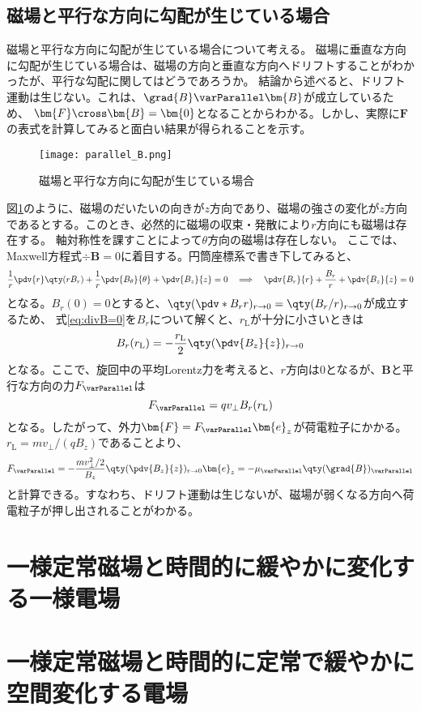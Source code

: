 \subsection{磁場と平行な方向に勾配が生じている場合}
磁場と平行な方向に勾配が生じている場合について考える。
磁場に垂直な方向に勾配が生じている場合は、磁場の方向と垂直な方向へドリフトすることがわかったが、平行な勾配に関してはどうであろうか。
結論から述べると、ドリフト運動は生じない。これは、$\grad{B}\varParallel \bm{B}$が成立しているため、
$\bm{F}\cross\bm{B} = \bm{0}$となることからわかる。しかし、実際に$\bm{F}$の表式を計算してみると面白い結果が得られることを示す。

\begin{figure}[H]
	\centering
	\texttt{[image: parallel\_B.png]}
	\caption{磁場と平行な方向に勾配が生じている場合}
	\label{fig:parallel_B}
\end{figure}
図\ref{fig:parallel_B}のように、磁場のだいたいの向きが$z$方向であり、磁場の強さの変化が$z$方向であるとする。このとき、必然的に磁場の収束・発散により$r$方向にも磁場は存在する。
軸対称性を課すことによって$\theta$方向の磁場は存在しない。
ここでは、Maxwell方程式$\div{\bm{B}} = 0$に着目する。円筒座標系で書き下してみると、
\begin{equation}
	\frac{1}{r}\pdv{r}\qty(rB_r) + \frac{1}{r}\pdv{B_\theta}{\theta} + \pdv{B_z}{z} = 0 \quad\Longrightarrow\quad \pdv{B_r}{r} + \frac{B_r}{r} + \pdv{B_z}{z} = 0
	\label{eq:divB=0}
\end{equation}
となる。$B_r(0) = 0$とすると、$\qty(\pdv*{B_r}{r})_{r\to 0} = \qty(B_r/r)_{r\to 0}$が成立するため、
式\eqref{eq:divB=0}を$B_r$について解くと、$r_{\text{L}}$が十分に小さいときは
\begin{equation}
	B_r(r_{\text{L}}) = -\frac{r_{\text{L}}}{2}\qty(\pdv{B_z}{z})_{r\to 0}
\end{equation}
となる。ここで、旋回中の平均Lorentz力を考えると、$r$方向は$0$となるが、$\bm{B}$と平行な方向の力$F_{\varParallel}$は
\begin{equation}
	F_{\varParallel} = qv_{\perp}B_r(r_{\text{L}})
\end{equation}
となる。したがって、外力$\bm{F} = F_{\varParallel}\bm{e}_z$が荷電粒子にかかる。$r_{\text{L}} = mv_{\perp}/(qB_z)$であることより、
\begin{equation}
	F_{\varParallel} = -\frac{mv^2_{\perp}/2}{B_z}\qty(\pdv{B_z}{z})_{r\to 0}\bm{e}_z = -\mu_{\varParallel}\qty(\grad{B})_{\varParallel}
\end{equation}
と計算できる。すなわち、ドリフト運動は生じないが、磁場が弱くなる方向へ荷電粒子が押し出されることがわかる。




\section{一様定常磁場と時間的に緩やかに変化する一様電場}
\section{一様定常磁場と時間的に定常で緩やかに空間変化する電場}

